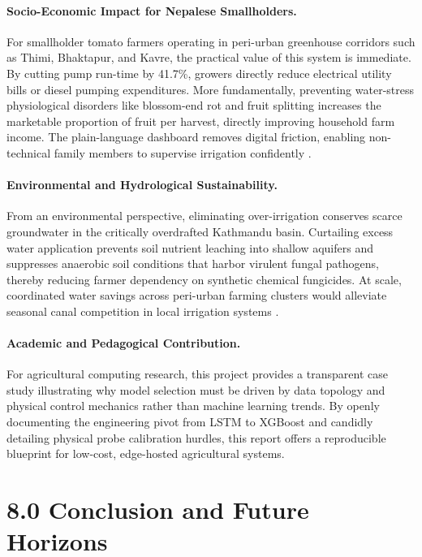 \documentclass[12pt, a4paper]{article}
\begin{document}
\paragraph{Socio-Economic Impact for Nepalese Smallholders.}
For smallholder tomato farmers operating in peri-urban greenhouse corridors such as Thimi, Bhaktapur, and Kavre, the practical value of this system is immediate. By cutting pump run-time by 41.7\%, growers directly reduce electrical utility bills or diesel pumping expenditures. More fundamentally, preventing water-stress physiological disorders like blossom-end rot and fruit splitting increases the marketable proportion of fruit per harvest, directly improving household farm income. The plain-language dashboard removes digital friction, enabling non-technical family members to supervise irrigation confidently \citep{zitan2021}.

\paragraph{Environmental and Hydrological Sustainability.}
From an environmental perspective, eliminating over-irrigation conserves scarce groundwater in the critically overdrafted Kathmandu basin. Curtailing excess water application prevents soil nutrient leaching into shallow aquifers and suppresses anaerobic soil conditions that harbor virulent fungal pathogens, thereby reducing farmer dependency on synthetic chemical fungicides. At scale, coordinated water savings across peri-urban farming clusters would alleviate seasonal canal competition in local irrigation systems \citep{kunwar2024}.

\paragraph{Academic and Pedagogical Contribution.}
For agricultural computing research, this project provides a transparent case study illustrating why model selection must be driven by data topology and physical control mechanics rather than machine learning trends. By openly documenting the engineering pivot from LSTM to XGBoost and candidly detailing physical probe calibration hurdles, this report offers a reproducible blueprint for low-cost, edge-hosted agricultural systems.

\section{8.0 Conclusion and Future Horizons}
\label{sec:conclusion}
\end{document}

